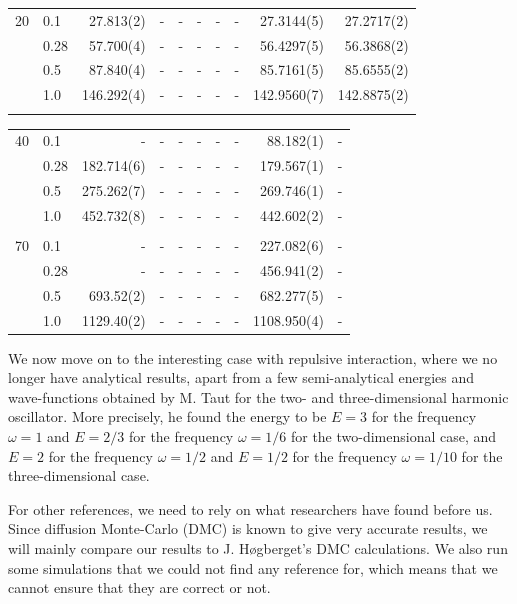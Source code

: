 \begin{landscape}
\begin{table} [H]
\begin{tabularx}{\hsize}{l:l|RRRRRRRR}
		20 & 0.1 & 27.813(2) & - & - & - & - & - & 27.3144(5) & 27.2717(2) \\ 
		& 0.28 & 57.700(4) & - & - & - & - & - & 56.4297(5) & 56.3868(2) \\
		& 0.5 & 87.840(4) & - & - & - & - & - & 85.7161(5) & 85.6555(2) \\
		& 1.0 & 146.292(4) & - & - & - & - & - & 142.9560(7) & 142.8875(2) \\ \hdashline 
	\end{tabularx}
\end{table}

\begin{table} [H]
	\begin{tabularx}{\hsize}{l:l|RRRRRRRR}
		\label{tab:quantumdotswinteraction3D2}
		\\
		
		40 & 0.1 & - & - & - & - & - & - & 88.182(1) & - \\ 
		& 0.28 & 182.714(6) & - & - & - & - & - & 179.567(1) & - \\
		& 0.5 & 275.262(7) & - & - & - & - & - & 269.746(1) & - \\
		& 1.0 & 452.732(8) & - & - & - & - & - & 442.602(2) & - \\ \hdashline \\
		
		70 & 0.1 & - & - & - & - & - & - & 227.082(6) & - \\ 
		& 0.28 & - & - & - & - & - & - & 456.941(2) & - \\
		& 0.5 & 693.52(2) & - & - & - & - & - & 682.277(5) & - \\
		& 1.0 & 1129.40(2) & - & - & - & - & - & 1108.950(4) & - \\ \hline\hline
	\end{tabularx}
\end{table}
\end{landscape}

We now move on to the interesting case with repulsive interaction, where we no longer have analytical results, apart from a few semi-analytical energies and wave-functions obtained by M. Taut for the two- and three-dimensional harmonic oscillator. More precisely, he found the energy to be $E=3$ for the frequency $\omega=1$ and $E=2/3$ for the frequency $\omega=1/6$ for the two-dimensional case, and $E=2$ for the frequency $\omega=1/2$ and $E=1/2$ for the frequency $\omega=1/10$ for the three-dimensional case. \cite{taut_two_1993}\cite{taut_two_1994}

For other references, we need to rely on what researchers have found before us. Since diffusion Monte-Carlo (DMC) is known to give very accurate results, we will mainly compare our results to J. Høgberget's DMC calculations. \cite{hogberget_quantum_2013} We also run some simulations that we could not find any reference for, which means that we cannot ensure that they are correct or not. 

